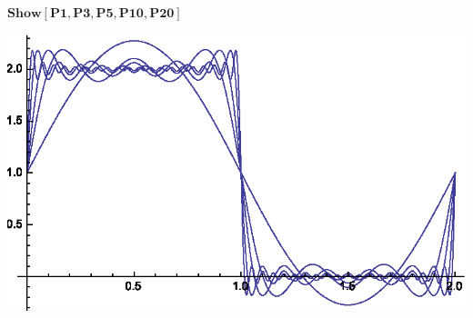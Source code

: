 \documentclass{article}
\begin{document}
\begin{doublespace}
\noindent\(\pmb{\text{Show}[\text{P1},\text{P3},\text{P5},\text{P10},\text{P20}]}\)
\end{doublespace}

\includegraphics{ex10_gr6.eps}

\begin{doublespace}
\noindent\(\pmb{\text{}}\)
\end{doublespace}

\begin{doublespace}
\noindent\(\pmb{\text{}}\)
\end{doublespace}

\begin{doublespace}
\noindent\(\pmb{\text{}}\)
\end{doublespace}

\begin{doublespace}
\noindent\(\pmb{\text{}}\)
\end{doublespace}

\begin{doublespace}
\noindent\(\pmb{\text{}}\)
\end{doublespace}

\begin{doublespace}
\noindent\(\pmb{\text{}}\)
\end{doublespace}
\end{document}
